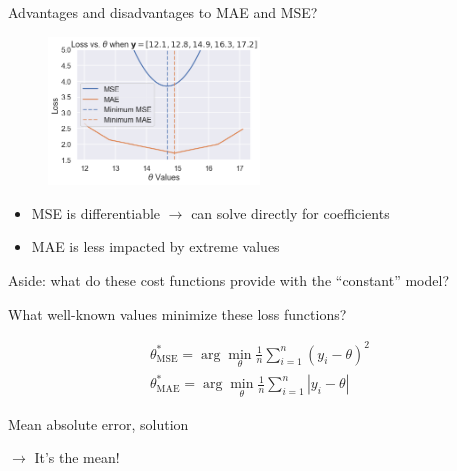 \documentclass[aspectratio=169, handout]{beamer}
\begin{document}
\begin{frame}{Advantages and disadvantages to MAE and MSE?}
\begin{figure}
	\includegraphics[width=0.5\textwidth]{mae_vs_mse}
	\caption*{}
\end{figure}
\pause
\vspace{-10mm}
\begin{itemize}
	\item MSE is differentiable $\rightarrow$ can solve directly for coefficients
	\item MAE is less impacted by extreme values
\end{itemize}
\end{frame}

\begin{frame}{Aside: what do these cost functions provide with the ``constant'' model?}

What well-known values minimize these loss functions?

	\begin{align*}
		\theta^*_{\text{MSE}} = \arg \min_\theta  \frac{1}{n}\sum_{i=1}^n (y_i - \theta)^2\\
		\theta^*_{\text{MAE}} = \arg \min_\theta  \frac{1}{n}\sum_{i=1}^n |y_i - \theta|
	\end{align*}

\end{frame}

\begin{frame}{Mean absolute error, solution}


$\rightarrow $ It's the mean!

\end{frame}
\end{document}
